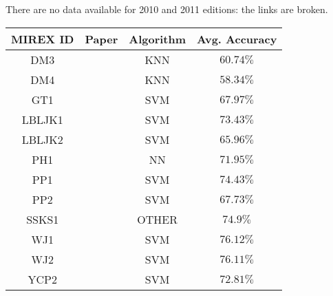 There are no data available for 2010 and 2011 editions: the links are broken.


\begin{center}

  \begin{tabularx}{\textwidth}{c|X|c|c}

    \textbf{MIREX ID} & \textbf{Paper} & \textbf{Algorithm} & \textbf{Avg. Accuracy} \\
    \hline

    DM3   & \citet{dm3_2012} & KNN & $60.74\%$ \\
    DM4 & \citet{dm4_2012} & KNN & $58.34\%$ \\
    GT1 & \citet{gt_2012} & SVM & $67.97\%$ \\
    LBLJK1 & \citet{lbljk_2012} & SVM & $73.43\%$ \\
    LBLJK2 & \citet{lbljk_2012} & SVM & $65.96\%$ \\
    PH1 & \citet{ph_2012} & NN & $71.95\%$ \\
    PP1 & \citet{pp_2012} & SVM & $74.43\%$ \\
    PP2 & \citet{pp_2012} & SVM & $67.73\%$ \\
    SSKS1 & \citet{ssks_2012} & OTHER & $74.9\%$ \\
    WJ1 & \citet{wj_2012} & SVM & $76.12\%$ \\
    WJ2 & \citet{wj_2012} & SVM & $76.11\%$ \\
    YCP2 & \citet{ycp_2012} & SVM & $72.81\%$ \\

  \end{tabularx}

  \label{tab:mirex2012}

\end{center}


